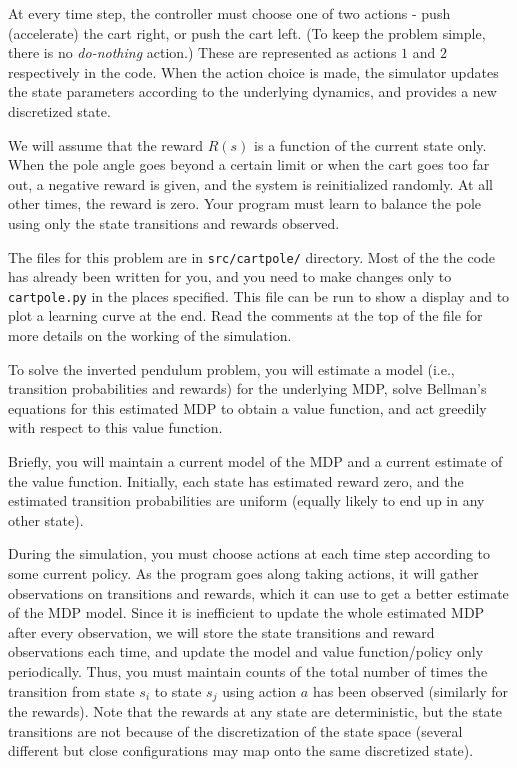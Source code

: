 At every time step, the controller must choose one of two actions -
push (accelerate) the cart right, or push the cart left.
(To keep the problem simple, there is no {\it do-nothing} action.)
These are represented as actions $1$ and $2$ respectively in the code.  
When the action choice is made, the simulator updates the state parameters 
according to the underlying dynamics, and provides a new discretized state.

We will assume that the reward $R(s)$ is a function of the current state only.
When the pole angle goes beyond a certain limit or when the cart goes
too far out, a negative reward is given, and the system is reinitialized 
randomly. At all other times, the reward is zero.  Your program must learn 
to balance the pole using only the state transitions and rewards observed.

The files for this problem are in {\tt src/cartpole/} directory.
Most of the the code has already been written for you, and you need 
to make changes only to {\tt cartpole.py} in the places specified. This 
file can be run to show a display and to plot a learning curve 
at the end.  Read the comments at the top of the file for more details
on the working of the simulation.

 To solve the inverted pendulum problem, you will estimate a 
  model (i.e., transition probabilities and rewards) for the underlying 
  MDP, solve Bellman's equations for this estimated MDP to obtain
  a value function, and act greedily with respect to this value function.  

  Briefly, you will maintain a current model of the MDP and a current
  estimate of the value function. Initially, each state has estimated reward zero,
  and the estimated transition probabilities are uniform (equally likely 
  to end up in any other state).

  During the simulation, you must choose actions at each time step 
  according to some current policy.  As the program goes along taking 
  actions, it will gather observations on transitions and rewards,
  which it can use to get a better estimate of the MDP model.
  Since it is inefficient to update the whole estimated MDP after every 
  observation, we will store the state transitions and reward observations 
  each time, and update the model and value function/policy only periodically. 
  Thus, you must maintain counts of the total number of times the 
  transition from state $s_i$ to state $s_j$ using action $a$ has been 
  observed (similarly for the rewards).  Note that the rewards at 
  any state are deterministic, but the state transitions are not because 
  of the discretization of the state space (several different but close
  configurations may map onto the same discretized state).

